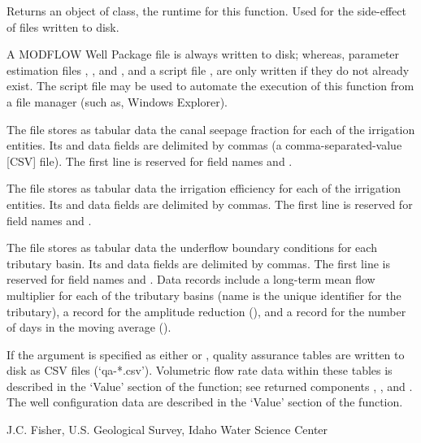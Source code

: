 \documentclass[a4paper]{book}
\begin{document}
%
\begin{Value}
Returns an object of  class, the runtime for this function.
Used for the side-effect of files written to disk.

A MODFLOW Well Package file  is always written to disk; whereas,
parameter estimation files , , and , and
a script file , are only written if they do not already exist.
The script file may be used to automate the execution of this function from a file manager (such as, Windows Explorer).

The  file stores as tabular data the canal seepage fraction for each of the irrigation entities.
Its  and  data fields are delimited by commas (a comma-separated-value [CSV] file).
The first line is reserved for field names  and .

The  file stores as tabular data the irrigation efficiency for each of the irrigation entities.
Its  and  data fields are delimited by commas.
The first line is reserved for field names  and .

The  file stores as tabular data the underflow boundary conditions for each tributary basin.
Its  and  data fields are delimited by commas.
The first line is reserved for field names  and .
Data records include a long-term mean flow multiplier for each of the tributary basins (name is the unique identifier for the tributary),
a record for the amplitude reduction (), and
a record for the number of days in the moving average ().

If the  argument is specified as either  or , quality assurance tables are written to disk as CSV files (`qa-*.csv').
Volumetric flow rate data within these tables is described in the `Value' section of the  function;
see returned  components , , and .
The well configuration data are described in the `Value' section of the  function.
\end{Value}
%
\begin{Author}\relax
J.C. Fisher, U.S. Geological Survey, Idaho Water Science Center
\end{Author}
\end{document}
